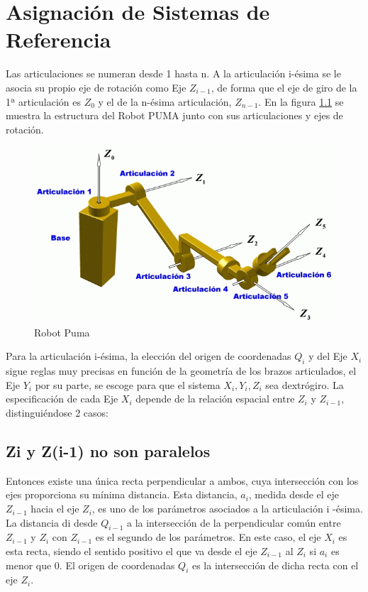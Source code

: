 \documentclass[11pt,a4paper,oldfontcommands,oneside]{memoir}
\begin{document}
\chapter{Asignación de Sistemas de Referencia}
Las articulaciones se numeran desde 1 hasta n. A la articulación i-ésima se le asocia su propio eje de rotación como Eje $Z_{i-1}$, de forma que el eje de giro de la 1ª articulación es $Z_0$ y el de la n-ésima articulación, $Z_{n-1}$.
En la figura \ref{1} se muestra la estructura del Robot PUMA junto con sus articulaciones y ejes de rotación.

\begin{figure}[h]
	\includegraphics[scale=1]{1.png}
	\caption{Robot Puma}
	\label{1}
\end{figure}

Para la articulación i-ésima, la elección del origen de coordenadas $Q_i$ y del Eje $X_i$ sigue reglas muy precisas en función de la geometría de los brazos articulados, el Eje $Y_i$ por su parte, se escoge para que el sistema ${X_i, Y_i, Z_i}$ sea dextrógiro. La especificación de cada Eje $X_i$ depende de la relación espacial entre $Z_i$ y $Z_{i-1}$, distinguiéndose 2 casos:

\section{Zi y Z(i-1) no son paralelos}
Entonces existe una única recta perpendicular a ambos, cuya intersección con los ejes proporciona su mínima distancia. Esta distancia, $a_i$, medida desde el eje $Z_{i-1}$ hacia el eje $Z_i$, es uno de los parámetros asociados a la articulación i -ésima.
La distancia di desde $Q_{i-1}$ a la intersección de la perpendicular común entre $Z_{i-1}$ y $Z_i$ con $Z_{i-1}$ es el segundo de los parámetros. En este caso, el eje $X_i$ es esta recta, siendo el sentido positivo el que va desde el eje $Z_{i-1}$ al $Z_i$ si $a_i$ es menor que 0.
El origen de coordenadas $Q_i$ es la intersección de dicha recta con el eje $Z_i$.
\end{document}
